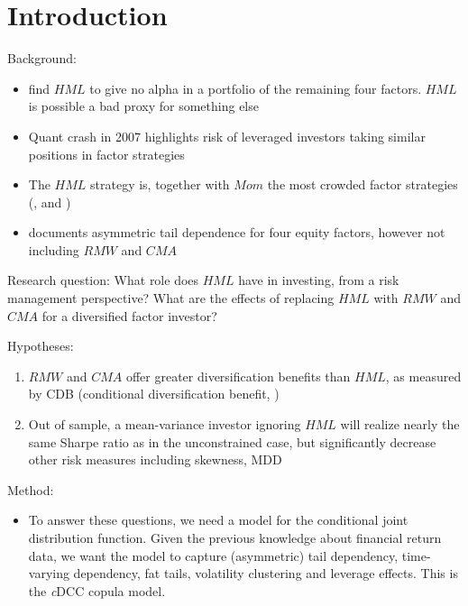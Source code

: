 \section{Introduction}
Background:
\begin{itemize}
	\item \textcite{FF2015} find $HML$ to give no alpha in a portfolio of the remaining four factors. $HML$ is possible a bad proxy for something else
	\item Quant crash in 2007 highlights risk of leveraged investors taking similar positions in factor strategies \autocite{KhandaniLo2011}
	\item The $HML$ strategy is, together with $Mom$ the most crowded factor strategies (\textcite{Pedersen2015}, \textcite{AQREMN} and \textcite{McKEMN})
	\item \textcite{ChristoffersenLanglois2013} documents asymmetric tail dependence for four equity factors, however not including $RMW$ and $CMA$
\end{itemize}

Research question:
What role does $HML$ have in investing, from a risk management perspective? What are the effects of replacing $HML$ with $RMW$ and $CMA$ for a diversified factor investor?

Hypotheses:
\begin{enumerate}
	\item $RMW$ and $CMA$ offer greater diversification benefits than $HML$, as measured by CDB (conditional diversification benefit, \autocite{ChristoffersenErrunzaJacobLanglois2012})
	\item Out of sample, a mean-variance investor ignoring $HML$ will realize nearly the same Sharpe ratio as in the unconstrained case, but significantly decrease other risk measures including skewness, MDD
\end{enumerate}

Method:
\begin{itemize}
	\item To answer these questions, we need a model for the conditional joint distribution function. Given the previous knowledge about financial return data, we want the model to capture (asymmetric) tail dependency, time-varying dependency, fat tails, volatility clustering and leverage effects. This is the \textit{c}DCC copula model.
\end{itemize}	

